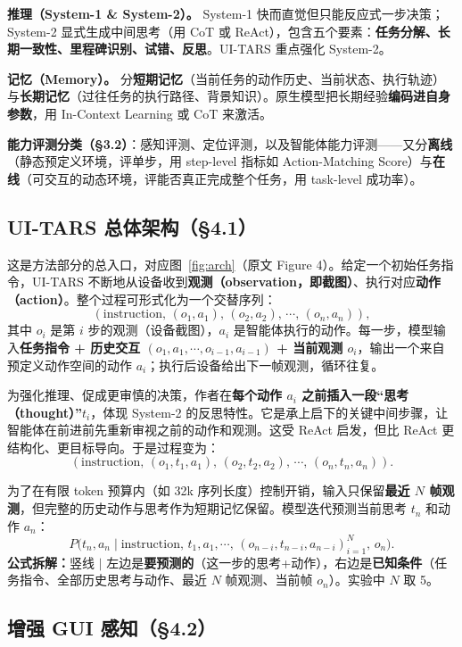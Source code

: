 \documentclass[11pt,UTF8,fontset=fandol]{ctexart}
\begin{document}
\textbf{推理（System-1 \& System-2）。} System-1 快而直觉但只能反应式一步决策；System-2 显式生成中间思考（用 CoT 或 ReAct），包含五个要素：\textbf{任务分解、长期一致性、里程碑识别、试错、反思}。UI-TARS 重点强化 System-2。

\textbf{记忆（Memory）。} 分\textbf{短期记忆}（当前任务的动作历史、当前状态、执行轨迹）与\textbf{长期记忆}（过往任务的执行路径、背景知识）。原生模型把长期经验\textbf{编码进自身参数}，用 In-Context Learning 或 CoT 来激活。

\textbf{能力评测分类（§3.2）}：感知评测、定位评测，以及智能体能力评测——又分\textbf{离线}（静态预定义环境，评单步，用 step-level 指标如 Action-Matching Score）与\textbf{在线}（可交互的动态环境，评能否真正完成整个任务，用 task-level 成功率）。

\subsection{UI-TARS 总体架构（§4.1）}

这是方法部分的总入口，对应图~\ref{fig:arch}（原文 Figure 4）。给定一个初始任务指令，UI-TARS 不断地从设备收到\textbf{观测（observation，即截图）}、执行对应\textbf{动作（action）}。整个过程可形式化为一个交替序列：
\[
(\text{instruction},\,(o_1,a_1),\,(o_2,a_2),\,\cdots,\,(o_n,a_n)),
\]
其中 $o_i$ 是第 $i$ 步的观测（设备截图），$a_i$ 是智能体执行的动作。每一步，模型输入\textbf{任务指令 + 历史交互 $(o_1,a_1,\cdots,o_{i-1},a_{i-1})$ + 当前观测 $o_i$}，输出一个来自预定义动作空间的动作 $a_i$；执行后设备给出下一帧观测，循环往复。

为强化推理、促成更审慎的决策，作者在\textbf{每个动作 $a_i$ 之前插入一段“思考（thought）”$t_i$}，体现 System-2 的反思特性。它是承上启下的关键中间步骤，让智能体在前进前先重新审视之前的动作和观测。这受 ReAct 启发，但比 ReAct 更结构化、更目标导向。于是过程变为：
\[
(\text{instruction},\,(o_1,t_1,a_1),\,(o_2,t_2,a_2),\,\cdots,\,(o_n,t_n,a_n)).
\]

为了在有限 token 预算内（如 32k 序列长度）控制开销，输入只保留\textbf{最近 $N$ 帧观测}，但完整的历史动作与思考作为短期记忆保留。模型迭代预测当前思考 $t_n$ 和动作 $a_n$：
\[
P\big(t_n,a_n \mid \text{instruction},\,t_1,a_1,\cdots,\,(o_{n-i},t_{n-i},a_{n-i})_{i=1}^{N},\,o_n\big).
\]
\textbf{公式拆解：}竖线 $\mid$ 左边是\textbf{要预测的}（这一步的思考+动作），右边是\textbf{已知条件}（任务指令、全部历史思考与动作、最近 $N$ 帧观测、当前帧 $o_n$）。实验中 $N$ 取 5。

\subsection{增强 GUI 感知（§4.2）}
\end{document}
